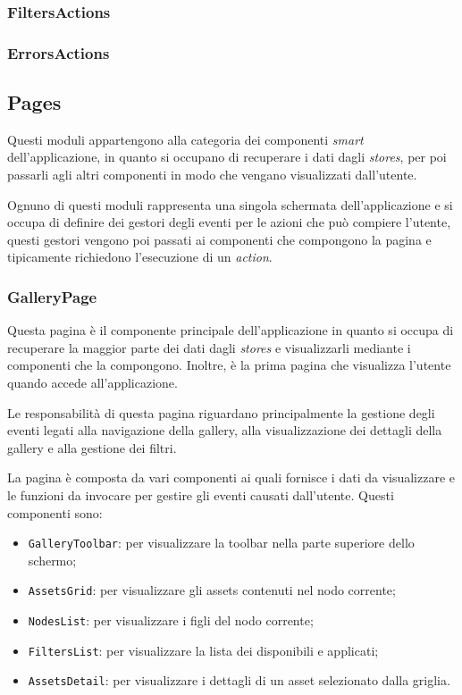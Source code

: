 \subsubsection{FiltersActions}


\subsubsection{ErrorsActions}



\subsection{Pages}

Questi moduli appartengono alla categoria dei componenti \textit{smart} dell'applicazione, in quanto si occupano di recuperare i dati dagli \textit{stores}, per poi passarli agli altri componenti in modo che vengano visualizzati dall'utente.

Ognuno di questi moduli rappresenta una singola schermata dell'applicazione e si occupa di definire dei gestori degli eventi per le azioni che può compiere l'utente, questi gestori vengono poi passati ai componenti che compongono la pagina e tipicamente richiedono l'esecuzione di un \textit{action}.

\subsubsection{GalleryPage}

Questa pagina è il componente principale dell'applicazione in quanto si occupa di recuperare la maggior parte dei dati dagli \textit{stores} e visualizzarli mediante i componenti che la compongono. Inoltre, è la prima pagina che visualizza l'utente quando accede all'applicazione.

Le responsabilità di questa pagina riguardano principalmente la gestione degli eventi legati alla navigazione della gallery, alla visualizzazione dei dettagli della gallery e alla gestione dei filtri.

La pagina è composta da vari componenti ai quali fornisce i dati da visualizzare e le funzioni da invocare per gestire gli eventi causati dall'utente.
Questi componenti sono:
\begin{itemize}
\item \texttt{GalleryToolbar}: per visualizzare la toolbar nella parte superiore dello schermo;
\item \texttt{AssetsGrid}: per visualizzare gli assets contenuti nel nodo corrente;
\item \texttt{NodesList}: per visualizzare i figli del nodo corrente;
\item \texttt{FiltersList}: per visualizzare la lista dei disponibili e applicati;
\item \texttt{AssetsDetail}: per visualizzare i dettagli di un asset selezionato dalla griglia.
\end{itemize}

